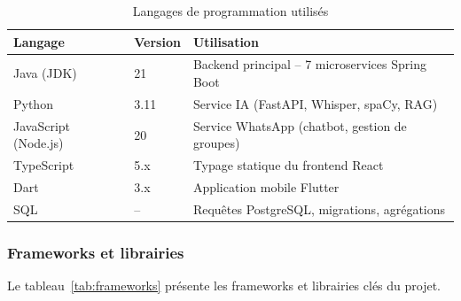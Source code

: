 \begin{table}[H]
\centering
\caption{Langages de programmation utilis\'{e}s}
\label{tab:langages}
\begin{tabular}{|p{3.5cm}|p{2cm}|p{7.5cm}|}
\hline
\textbf{Langage} & \textbf{Version} & \textbf{Utilisation} \\
\hline
Java (JDK) & 21 & Backend principal -- 7 microservices Spring Boot \\
\hline
Python & 3.11 & Service IA (FastAPI, Whisper, spaCy, RAG) \\
\hline
JavaScript (Node.js) & 20 & Service WhatsApp (chatbot, gestion de groupes) \\
\hline
TypeScript & 5.x & Typage statique du frontend React \\
\hline
Dart & 3.x & Application mobile Flutter \\
\hline
SQL & -- & Requ\^{e}tes PostgreSQL, migrations, agr\'{e}gations \\
\hline
\end{tabular}
\end{table}

\subsubsection{Frameworks et librairies}

Le tableau~\ref{tab:frameworks} pr\'{e}sente les frameworks et librairies cl\'{e}s du projet.


